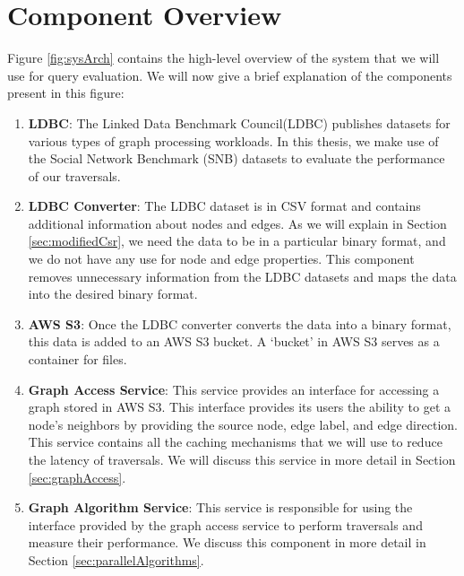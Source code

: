 \section{Component Overview}\label{sec:componentOverview}
Figure \ref{fig:sysArch} contains the high-level overview of the system that
we will use for query evaluation. We will now give a brief explanation of the
components present in this figure:
\begin{enumerate}
    \item \textbf{LDBC}: The Linked Data Benchmark Council(LDBC) publishes datasets
        for various types of graph processing workloads. In this thesis, we make
        use of the Social Network Benchmark (SNB) datasets to evaluate
        the performance of our traversals.
    \item \textbf{LDBC Converter}: The LDBC dataset is in CSV format and
        contains additional information about nodes and edges. As we will explain
        in Section \ref{sec:modifiedCsr}, we need the data to be in a particular
        binary format, and we do not have any use for node and edge properties.
        This component removes unnecessary information from
        the LDBC datasets and maps the data into the desired binary format.
    \item \textbf{AWS S3}: Once the LDBC converter converts the data into a
        binary format, this data is added to an AWS S3 bucket. A `bucket' in
        AWS S3 serves as a container for files.
    \item \textbf{Graph Access Service}: This service provides an interface for
        accessing a graph stored in AWS S3. This interface provides its users
        the ability to get a node's neighbors by providing
        the source node, edge label, and edge direction. This service contains
        all the caching mechanisms that we will use to reduce the latency of
        traversals. We will discuss this service in more detail in
        Section \ref{sec:graphAccess}.
    \item \textbf{Graph Algorithm Service}: This service is responsible for
        using the interface provided by the graph access service to perform
        traversals and measure their performance. We discuss this component in
        more detail in Section \ref{sec:parallelAlgorithms}.
\end{enumerate}

